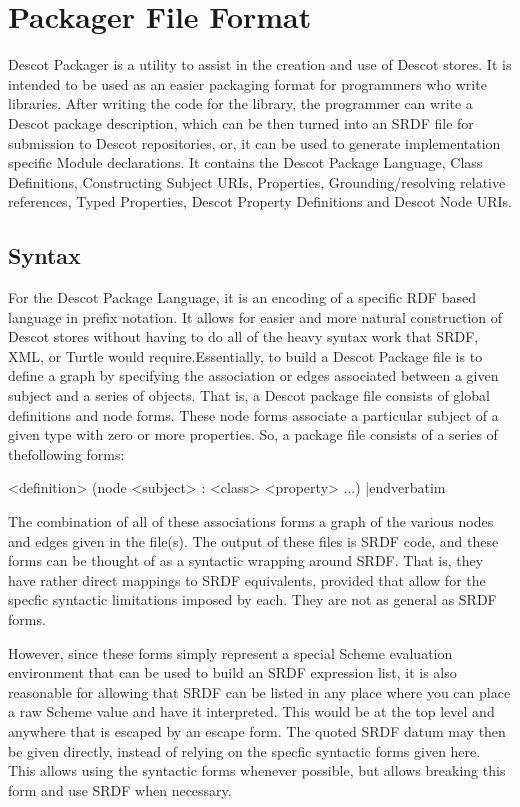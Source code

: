 \chapter{Packager File Format}{}%
Descot Packager is a utility to assist in the creation and use of Descot
stores. It is intended to be used as an easier packaging format for 
programmers who write libraries. After writing the code for the library,
the programmer can write a Descot package description, which can be 
then turned into an SRDF file for submission to Descot repositories, 
or, it can be used to generate implementation specific Module declarations.
It contains the Descot Package Language, Class Definitions, Constructing 
Subject URIs, Properties, Grounding/resolving relative references, Typed 
Properties, Descot Property Definitions and Descot Node URIs.

\section{Syntax}{}%
For the Descot Package Language, it is an encoding of a specific RDF
based language in prefix notation. It allows for easier and more natural 
construction of Descot stores without having to do all of the heavy syntax 
work that SRDF, XML, or Turtle would require.Essentially, to build a Descot 
Package file is to define a graph by specifying the association or edges 
associated between a given subject and a series of objects. That is, a Descot 
package file consists of global definitions and node forms. These node forms 
associate a particular subject of a given type with zero or more properties. 
So, a package file consists of a series of thefollowing forms:

\medskip\verbatim
<definition>
(node <subject> : <class> <property> ...)
|endverbatim
\medskip

\noindent
The combination of all
of these associations forms a graph of the various nodes and edges given 
in the file(s). The output of these files is SRDF code, and these forms 
can be thought of as a syntactic wrapping around SRDF. That is, they have 
rather direct mappings to SRDF equivalents, provided that allow for
the specfic syntactic limitations imposed by each. They are not as general 
as SRDF forms.

However, since these forms simply represent a special Scheme evaluation 
environment that can be used to build an SRDF expression list, it is also 
reasonable for allowing that SRDF can be listed in any place where you 
can place a raw Scheme value and have it interpreted. This would be at the 
top level and anywhere that is escaped by an escape form. The quoted SRDF datum
may then be given directly, instead of relying on the specfic syntactic forms 
given here. This allows using the syntactic forms whenever possible, but
allows breaking this form and use SRDF when necessary.

